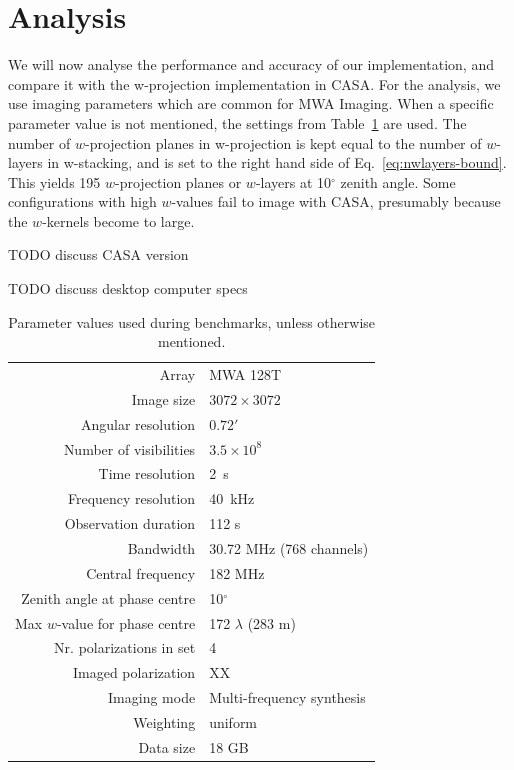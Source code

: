 \documentclass[useAMS,usenatbib]{mn2e}
\newcommand{\degree}{\ensuremath{^{\circ}}\xspace}
\begin{document}
\section{Analysis} \label{sec:analysis}
We will now analyse the performance and accuracy of our implementation, and compare it with the w-projection implementation in CASA. For the analysis, we use imaging parameters which are common for MWA Imaging. When a specific parameter value is not mentioned, the settings from Table~\ref{tbl:default-parameters} are used. The number of $w$-projection planes in w-projection is kept equal to the number of $w$-layers in w-stacking, and is set to the right hand side of Eq.~\eqref{eq:nwlayers-bound}. This yields 195 $w$-projection planes or $w$-layers at 10\degree zenith angle. Some configurations with high $w$-values fail to image with CASA, presumably because the $w$-kernels become to large.

TODO discuss CASA version

TODO discuss desktop computer specs
\begin{table}%
\caption{Parameter values used during benchmarks, unless otherwise mentioned.} \label{tbl:default-parameters}%
\begin{center}\begin{tabular}{rl}%
\hline
Array & MWA 128T \\
Image size & $3072 \times 3072$ \\
Angular resolution & $0.72'$ \\
Number of visibilities & $3.5 \times 10^8$ \\
Time resolution & 2~s \\
Frequency resolution & 40~kHz \\
Observation duration & 112 s\\
Bandwidth & 30.72 MHz (768 channels)\\
Central frequency & 182 MHz \\
Zenith angle at phase centre & 10\degree \\
Max $w$-value for phase centre & 172 $\lambda$ (283 m) \\
Nr. polarizations in set & 4 \\
Imaged polarization & XX \\
Imaging mode & Multi-frequency synthesis \\
Weighting & uniform \\
Data size & 18 GB \\
\hline
\end{tabular}\end{center}\end{table}
\end{document}
